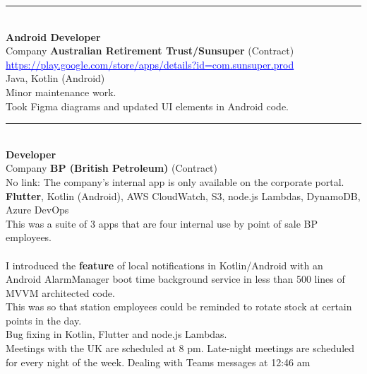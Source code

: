 \documentclass{article}
\begin{document}
%

\noindent\hfil\rule{0.5\textwidth}{.4pt}\hfil
\\

\textbf{ Android Developer }\\
Company  \textbf {Australian Retirement Trust/Sunsuper} (Contract)  \\

\textcolor{blue} { \underline{ https://play.google.com/store/apps/details?id=com.sunsuper.prod   } }  \\



 Java, Kotlin (Android) \\

Minor maintenance work. \\
Took Figma diagrams and updated UI elements in Android code. \\

\noindent\hfil\rule{0.5\textwidth}{.4pt}\hfil
\\

\textbf{ Developer }\\
Company  \textbf {BP (British Petroleum)}  (Contract) \\
No link: The company's internal app is only available on the corporate portal. \\

\textbf{Flutter}, Kotlin (Android), AWS CloudWatch, S3, node.js Lambdas,  DynamoDB, \\ 
Azure DevOps  \\

This was a suite of 3 apps that are four internal use by point of sale BP employees. \\
\\
I introduced the {\bf feature} of local notifications in Kotlin/Android with an Android AlarmManager boot time background service in less than 500 lines of MVVM architected code. \\
This was so that station employees could be reminded to rotate stock at certain points in the day. \\
 Bug fixing in Kotlin, Flutter and node.js Lambdas. \\
 Meetings with the UK are scheduled at 8 pm. Late-night meetings are scheduled for every night of the week. Dealing with Teams messages at 12:46 am \\
\\
\end{document}
